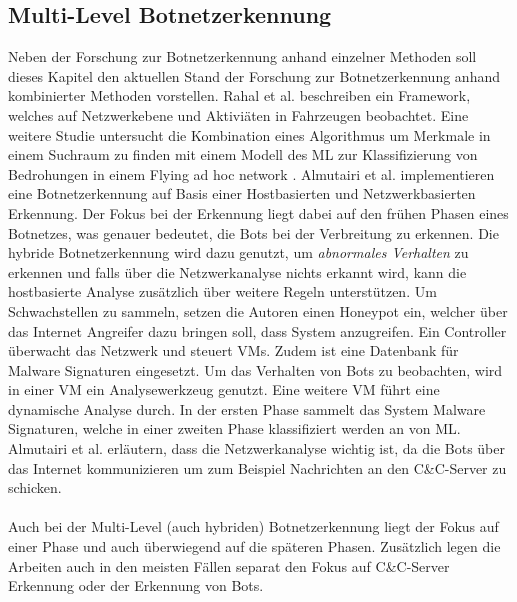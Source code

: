 \subsection*{Multi-Level Botnetzerkennung}
Neben der Forschung zur Botnetzerkennung anhand einzelner Methoden soll dieses Kapitel den aktuellen Stand der Forschung zur Botnetzerkennung anhand kombinierter Methoden vorstellen. Rahal et al. 
\cite{DBLP:journals/jnsm/RahalKGCG22} beschreiben ein Framework, welches auf Netzwerkebene und Aktiviäten in Fahrzeugen beobachtet. Eine weitere Studie untersucht die Kombination eines Algorithmus 
um Merkmale in einem Suchraum zu finden mit einem Modell des ML zur Klassifizierung von Bedrohungen in einem Flying ad hoc network \cite{DBLP:journals/bdcc/AbdulsattarAGKA22}. Almutairi et al. 
\cite{DBLP:journals/jcnc/AlmutairiMAA20} implementieren eine Botnetzerkennung auf Basis einer Hostbasierten und Netzwerkbasierten Erkennung. Der Fokus bei der Erkennung liegt dabei auf den frühen 
Phasen eines Botnetzes, was genauer bedeutet, die Bots bei der Verbreitung zu erkennen. Die hybride Botnetzerkennung wird dazu genutzt, um \textit{abnormales Verhalten} zu erkennen und falls über 
die Netzwerkanalyse nichts erkannt wird, kann die hostbasierte Analyse zusätzlich über weitere Regeln unterstützen. Um Schwachstellen zu sammeln, setzen die Autoren einen Honeypot ein, welcher über das 
Internet Angreifer dazu bringen soll, dass System anzugreifen. Ein Controller überwacht das Netzwerk und steuert VMs. Zudem ist eine Datenbank für Malware Signaturen eingesetzt. Um das Verhalten von Bots 
zu beobachten, wird in einer VM ein Analysewerkzeug genutzt. Eine weitere VM führt eine dynamische Analyse durch. In der ersten Phase sammelt das System Malware Signaturen, welche in einer zweiten Phase 
klassifiziert werden an von ML. Almutairi et al. erläutern, dass die Netzwerkanalyse wichtig ist, da die Bots über das Internet kommunizieren um zum Beispiel Nachrichten an den C\&C-Server zu schicken. \\ \\
Auch bei der Multi-Level (auch hybriden) Botnetzerkennung liegt der Fokus auf einer Phase und auch überwiegend auf die späteren Phasen. Zusätzlich legen die Arbeiten auch in den meisten Fällen separat
den Fokus auf C\&C-Server Erkennung oder der Erkennung von Bots.


